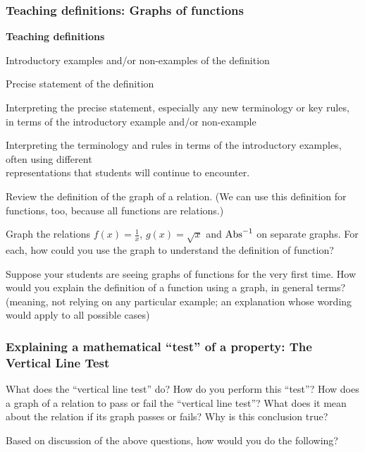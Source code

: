\documentclass[11pt]{article}
\newcommand{\handout}{\subsubsection}
\newcommand\tn{\textnormal}
\theoremstyle{definition}
\begin{document}
\newpage 

\handout{Teaching definitions: Graphs of functions}

\begin{mdframed}
\begin{center}
{\bf Teaching definitions}
\end{center}
\vspace*{-4pt}
	\begin{itemize*}
	\item Introductory examples and/or non-examples of the definition
	\item Precise statement of the definition
	\item Interpreting the precise statement, especially any new terminology or key rules, in terms of the introductory example and/or non-example
	\item Interpreting the terminology and rules in terms of the introductory examples, often using different \\ representations that students will continue to encounter.
	\end{itemize*}
\end{mdframed}


Review the definition of the graph of a relation. (We can use this definition for functions, too, because all functions are relations.)

Graph the relations $f(x)=\frac{1}{x}$, $g(x)=\sqrt{x}$ and $\tn{Abs}^{-1}$ on separate graphs. For each, how could you use the graph to understand the definition of function?

Suppose your students are seeing graphs of functions for the very first time. How would you explain the definition of a function using a graph, in general terms? (meaning, not relying on any particular example; an explanation whose wording would apply to all possible cases)


\newpage
\handout{Explaining a mathematical ``test'' of a property: The Vertical Line Test}


What does the ``vertical line test'' do? How do you perform this ``test''? How does a graph of a relation to pass or fail the ``vertical line test''? What does it mean about the relation if its graph passes or fails? Why is this conclusion true?

\vfill 

Based on discussion of the above questions, how would you do the following?
\end{document}
